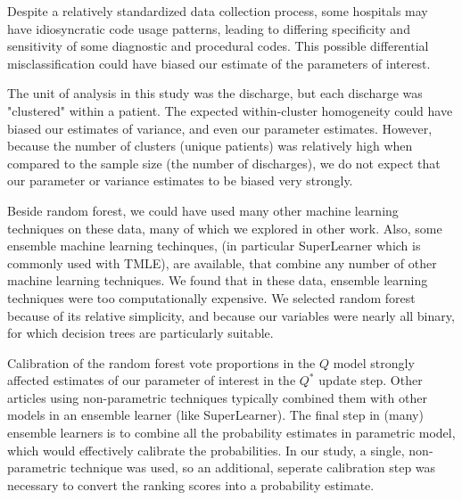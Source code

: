 \documentclass[]{article}\usepackage[]{graphicx}\usepackage[]{color}
\begin{document}
Despite a relatively standardized data collection process, some hospitals may have idiosyncratic code usage patterns, leading to differing specificity and sensitivity of some diagnostic and procedural codes. This possible differential misclassification could have biased our estimate of the parameters of interest.

The unit of analysis in this study was the discharge, but each discharge was "clustered" within a patient. The expected within-cluster homogeneity could have biased our estimates of variance, and even our parameter estimates. However, because the number of clusters (unique patients) was relatively high when compared to the sample size (the number of discharges), we do not expect that our parameter or variance estimates to be biased very strongly.

Beside random forest, we could have used many other machine learning techniques on these data, many of which we explored in other work.  Also, some ensemble machine learning techinques, (in particular SuperLearner which is commonly used with TMLE), are available, that combine any number of other machine learning techniques. We found that in these data, ensemble learning techniques were too computationally expensive. We selected random forest because of its relative simplicity, and because our variables were nearly all binary, for which decision trees are particularly suitable.

Calibration of the random forest vote proportions in the $Q$ model strongly affected estimates of our parameter of interest in the $Q^*$ update step. Other articles using non-parametric techniques typically combined them with other models in an ensemble learner (like SuperLearner). The final step in (many) ensemble learners is to combine all the probability estimates in parametric model, which would effectively calibrate the probabilities. In our study, a single, non-parametric technique was used, so an additional, seperate calibration step was necessary to convert the ranking scores into a probability estimate. 

\end{document}
